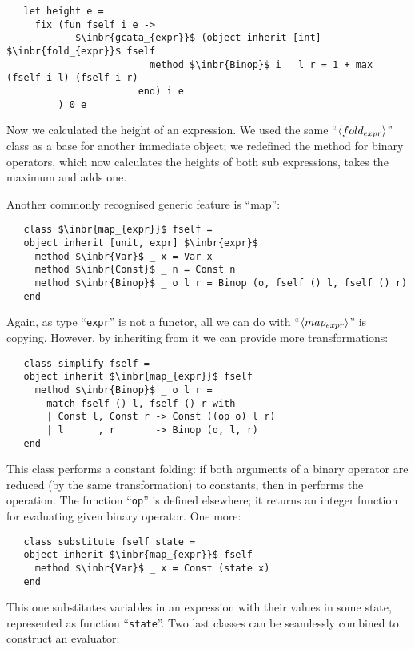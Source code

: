 \begin{lstlisting}
   let height e =
     fix (fun fself i e ->
            $\inbr{gcata_{expr}}$ (object inherit [int] $\inbr{fold_{expr}}$ fself
                         method $\inbr{Binop}$ i _ l r = 1 + max (fself i l) (fself i r) 
                       end) i e
         ) 0 e
\end{lstlisting}

Now we calculated the height of an expression. We used the same ``$\left<fold_{expr}\right>$'' class as a base for another immediate object; we redefined the method for
binary operators, which now calculates the heights of both sub expressions, takes the maximum and adds one. 

Another commonly recognised generic feature is ``map'':

\begin{lstlisting}
   class $\inbr{map_{expr}}$ fself =
   object inherit [unit, expr] $\inbr{expr}$
     method $\inbr{Var}$ _ x = Var x
     method $\inbr{Const}$ _ n = Const n
     method $\inbr{Binop}$ _ o l r = Binop (o, fself () l, fself () r)
   end
\end{lstlisting}

Again, as type ``\lstinline{expr}'' is not a functor, all we can do with ``$\left<map_{expr}\right>$'' is copying. However, by inheriting from it we
can provide more transformations:

\begin{lstlisting}
   class simplify fself =
   object inherit $\inbr{map_{expr}}$ fself
     method $\inbr{Binop}$ _ o l r =
       match fself () l, fself () r with
       | Const l, Const r -> Const ((op o) l r)
       | l      , r       -> Binop (o, l, r)     
   end
\end{lstlisting}

This class performs a constant folding: if both arguments of a binary operator are reduced (by the same transformation) to constants, then in
performs the operation. The function ``\lstinline{op}'' is defined elsewhere; it returns an integer function for evaluating given binary operator. One more:


\begin{lstlisting}
   class substitute fself state =
   object inherit $\inbr{map_{expr}}$ fself
     method $\inbr{Var}$ _ x = Const (state x)  
   end
\end{lstlisting}

This one substitutes variables in an expression with their values in some state, represented as function ``\lstinline{state}''. Two last
classes can be seamlessly combined to construct an evaluator:

